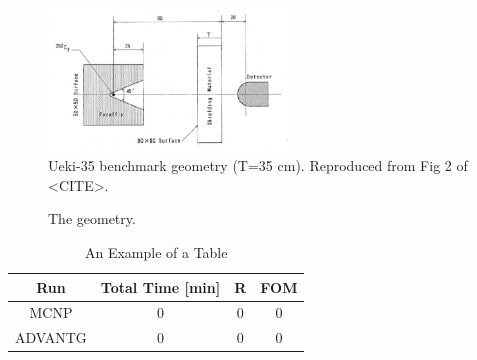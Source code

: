 \documentclass[conference]{IEEEtran}
\begin{document}
\begin{figure}[!t]
\centering
\includegraphics[width=2.5in]{uekifig2}
\caption{Ueki-35 benchmark geometry (T=35 cm). Reproduced from Fig 2 of <CITE>.}
\label{fig:bestfitness}
\end{figure}

\begin{figure}[!t]
\centering
{}
\hfil
{}
\caption{The geometry.}
\label{fig:uekimcnp}
\end{figure}

\begin{table}[!t]
\caption{An Example of a Table}
\label{tab:results}
\centering
\begin{tabular}{|c|c|c|c|} \hline
Run & Total Time [min] & R & FOM \\ \hline
MCNP & 0 & 0 & 0 \\ \hline
ADVANTG & 0 & 0 & 0 \\ \hline
\end{tabular}
\end{table}
\end{document}
